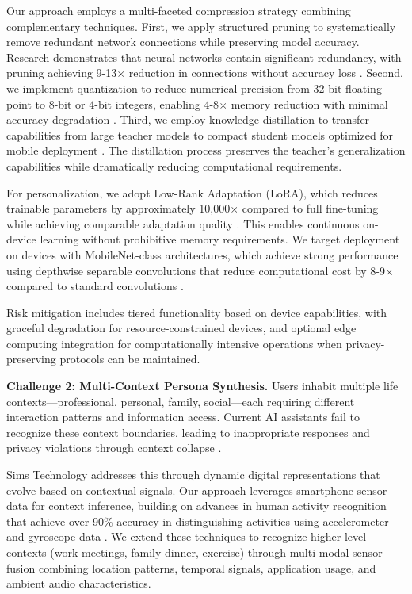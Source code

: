 \documentclass[11pt]{article}
\begin{document}
Our approach employs a multi-faceted compression strategy combining complementary techniques. First, we apply structured pruning to systematically remove redundant network connections while preserving model accuracy. Research demonstrates that neural networks contain significant redundancy, with pruning achieving 9-13$\times$ reduction in connections without accuracy loss \cite{liang2021pruning}. Second, we implement quantization to reduce numerical precision from 32-bit floating point to 8-bit or 4-bit integers, enabling 4-8$\times$ memory reduction with minimal accuracy degradation \cite{gholami2022survey}. Third, we employ knowledge distillation to transfer capabilities from large teacher models to compact student models optimized for mobile deployment \cite{hinton2015distilling}. The distillation process preserves the teacher's generalization capabilities while dramatically reducing computational requirements.

For personalization, we adopt Low-Rank Adaptation (LoRA), which reduces trainable parameters by approximately 10,000$\times$ compared to full fine-tuning while achieving comparable adaptation quality \cite{hu2022lora}. This enables continuous on-device learning without prohibitive memory requirements. We target deployment on devices with MobileNet-class architectures, which achieve strong performance using depthwise separable convolutions that reduce computational cost by 8-9$\times$ compared to standard convolutions \cite{howard2017mobilenets}.

Risk mitigation includes tiered functionality based on device capabilities, with graceful degradation for resource-constrained devices, and optional edge computing integration for computationally intensive operations when privacy-preserving protocols can be maintained.

\textbf{Challenge 2: Multi-Context Persona Synthesis.}
Users inhabit multiple life contexts---professional, personal, family, social---each requiring different interaction patterns and information access. Current AI assistants fail to recognize these context boundaries, leading to inappropriate responses and privacy violations through context collapse \cite{dey2001understanding}. 

Sims Technology addresses this through dynamic digital representations that evolve based on contextual signals. Our approach leverages smartphone sensor data for context inference, building on advances in human activity recognition that achieve over 90\% accuracy in distinguishing activities using accelerometer and gyroscope data \cite{wang2019deep}. We extend these techniques to recognize higher-level contexts (work meetings, family dinner, exercise) through multi-modal sensor fusion combining location patterns, temporal signals, application usage, and ambient audio characteristics.
\end{document}

